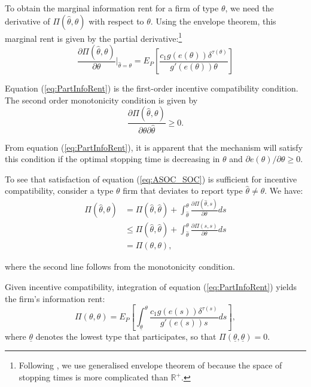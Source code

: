 \documentclass[12pt]{article}
\begin{document}
To obtain the marginal information rent for a firm of type $\theta$, we need the derivative of $\Pi(\hat{\theta},\theta)$ with respect to $\theta$. Using the envelope theorem, this marginal rent is given by the partial derivative:\footnote{Following \citet{bib:board}, we use generalised envelope theorem of \citet{bib:milgromsegal} because the space of stopping times is more complicated than $\mathbb{R}^+$.}
\begin{equation}
\frac{\partial\Pi(\hat{\theta},\theta)}{\partial\theta}\bigg|_{\hat{\theta}=\theta}=
E_P\left[\frac{c_1g(e(\theta))\delta^{\tau(\theta)}}{g'(e(\theta))\theta}\right] \label{eq:PartInfoRent}
\end{equation}

Equation (\ref{eq:PartInfoRent}) is the first-order incentive compatibility condition. The second order monotonicity condition is given by
\begin{equation}
\frac{\partial\Pi(\hat{\theta},\theta)}{\partial\theta\partial\hat{\theta}}\geq0. \label{eq:ASOC_SOC}
\end{equation}

From equation (\ref{eq:PartInfoRent}), it is apparent that the mechanism will satisfy this condition if the optimal stopping time is decreasing in $\theta$ and $\partial e(\theta)/\partial\theta\geq0$.

To see that satisfaction of equation (\ref{eq:ASOC_SOC}) is sufficient for incentive compatibility, consider a type $\theta$ firm that deviates to report type $\hat{\theta}\neq\theta$. We have:
\begin{align}
\Pi(\hat{\theta},\theta) &= \Pi(\hat{\theta},\hat{\theta})+\int_{\hat{\theta}}^\theta \frac{\partial\Pi(\hat{\theta},s)}{\partial\theta}ds \nonumber \\
&\leq \Pi(\hat{\theta},\hat{\theta})+\int_{\hat{\theta}}^\theta \frac{\partial\Pi(s,s)}{\partial\theta}ds \nonumber \\
&= \Pi(\theta,\theta),
\end{align}

where the second line follows from the monotonicity condition.

Given incentive compatibility, integration of equation (\ref{eq:PartInfoRent}) yields the firm's information rent:
\begin{equation}
\Pi(\theta,\theta) = E_P\left[\int_{\underline{\theta}}^\theta \frac{c_1g(e(s))\delta^{\tau(s)}}{g'(e(s))s}ds\right], \label{eq:InfoRent}
\end{equation}
where $\underline{\theta}$ denotes the lowest type that participates, so that $\Pi(\underline{\theta},\underline{\theta})=0$.
\end{document}
